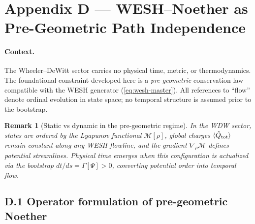 \documentclass[12pt,a4paper]{article}
\newtheorem{remark}{Remark}[section]
\numberwithin{equation}{section}
\begin{document}
\vspace{1cm}

\vspace{1cm}

\section*{Appendix D — WESH--Noether as Pre-Geometric Path Independence}
\label{app:wesh-noether-pregeom}

\begingroup
\setcounter{equation}{0}
\renewcommand\theequation{D.\arabic{equation}}
\renewcommand{\theHequation}{D.\arabic{equation}}
\setcounter{theorem}{0}
\renewcommand\thetheorem{D.\arabic{theorem}}
\renewcommand{\theHtheorem}{D.\arabic{theorem}}
\setcounter{corollary}{0}
\renewcommand\thecorollary{D.\arabic{corollary}}
\renewcommand{\theHcorollary}{D.\arabic{corollary}}
\setcounter{remark}{0}
\renewcommand\theremark{D.\arabic{remark}}
\renewcommand{\theHremark}{D.\arabic{remark}}
\setcounter{lemma}{0}
\renewcommand\thelemma{D.\arabic{lemma}}
\renewcommand{\theHlemma}{D.\arabic{lemma}}

\paragraph{Context.}
The Wheeler--DeWitt sector carries no physical time, metric, or thermodynamics. The foundational constraint developed here is a \emph{pre-geometric} conservation law compatible with the WESH generator (\eqref{eq:wesh-master}). All references to ``flow'' denote ordinal evolution in state space; no temporal structure is assumed prior to the bootstrap.

\begin{remark}[Static vs dynamic in the pre-geometric regime]
\label{rem:static-dynamic}
In the WDW sector, states are ordered by the Lyapunov functional $\mathcal{M}[\rho]$, global charges $\langle\hat{Q}_{\rm tot}\rangle$ remain constant along any WESH flowline, and the gradient $\nabla_\rho\mathcal{M}$ defines potential streamlines. Physical time emerges when this configuration is \emph{actualized} via the bootstrap $dt/ds=\Gamma[\Psi]>0$, converting potential order into temporal flow.
\end{remark}


\vspace{0.3cm}
\subsection*{D.1 Operator formulation of pre-geometric Noether}
\vspace{0.3cm}
\end{document}
